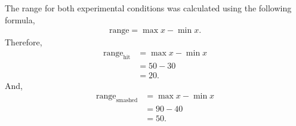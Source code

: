 \documentclass[a4paper,11pt]{report}
\begin{document}
The range for both experimental conditions was calculated using the following
formula,
\begin{align*}
    \text{range} = \max{x} - \min{x}.
\end{align*}
Therefore,
\begin{align*}
    \text{range}_{\text{hit}} &= \max{x} - \min{x}\\
    &= 50 - 30\\
    &= 20.
\end{align*}
And,
\begin{align*}
    \text{range}_{\text{smashed}} &= \max{x} - \min{x}\\
    &= 90 - 40\\
    &= 50.
\end{align*}
\end{document}
